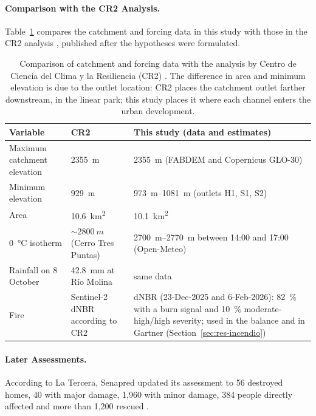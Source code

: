 \paragraph{Comparison with the CR2 Analysis.} Table~\ref{tab:cr2} compares the catchment and forcing data in this study with those in the CR2 analysis \citep{cr2_2026}, published after the hypotheses were formulated.
\begin{table}[htbp]\centering\small
\caption{Comparison of catchment and forcing data with the analysis by Centro de Ciencia del Clima y la Resiliencia (CR2) \citep{cr2_2026}. The difference in area and minimum elevation is due to the outlet location: CR2 places the catchment outlet farther downstream, in the linear park; this study places it where each channel enters the urban development.}\label{tab:cr2}
\begin{tabular}{p{}p{}p{}}\toprule
Variable & CR2 & This study (data and estimates)\\\midrule
Maximum catchment elevation & \SI{2355}{m} & \SI{2355}{m} (FABDEM and Copernicus GLO-30)\\
Minimum elevation & \SI{929}{m} & \SIrange{973}{1081}{m} (outlets H1, S1, S2)\\
Area & \SI{10.6}{km^2} & \SI{10.1}{km^2}\\
\SI{0}{\celsius} isotherm & $\sim\SI{2800}{m}$ (Cerro Tres Puntas) & \SIrange{2700}{2770}{m} between 14:00 and 17:00 (Open-Meteo)\\
Rainfall on 8 October & \SI{42.8}{mm} at Río Molina & same data\\
Fire & Sentinel-2 dNBR according to CR2 & dNBR (23-Dec-2025 and 6-Feb-2026): \SI{82}{\percent} with a burn signal and \SI{10}{\percent} moderate-high/high severity; used in the balance and in Gartner (Section~\ref{sec:res-incendio})\\
\bottomrule\end{tabular}
\end{table}

\paragraph{Later Assessments.} According to La Tercera, Senapred updated its assessment to 56 destroyed homes, 40 with major damage, 1,960 with minor damage, 384 people directly affected and more than 1,200 rescued \citep{latercera2026senapred}.
